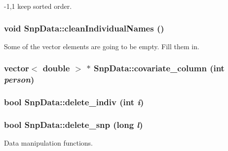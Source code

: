 -\/1,1 keep sorted order. \hypertarget{classSnpData_ae6d6c89606d8176f34b11b253b40f191}{
\subsubsection[{cleanIndividualNames}]{\setlength{\rightskip}{0pt plus 5cm}void SnpData::cleanIndividualNames ()}}
\label{classSnpData_ae6d6c89606d8176f34b11b253b40f191}
Some of the vector elements are going to be empty. Fill them in. \hypertarget{classSnpData_aadd312f6c8d9060a199728bf7e81a1fc}{
\subsubsection[{covariate\_\-column}]{\setlength{\rightskip}{0pt plus 5cm}vector$<$ double $>$ $\ast$ SnpData::covariate\_\-column (int {\em person})}}
\label{classSnpData_aadd312f6c8d9060a199728bf7e81a1fc}
\hypertarget{classSnpData_af7caa689a8257f534cd6a92dac45ee82}{
\subsubsection[{delete\_\-indiv}]{\setlength{\rightskip}{0pt plus 5cm}bool SnpData::delete\_\-indiv (int {\em i})}}
\label{classSnpData_af7caa689a8257f534cd6a92dac45ee82}
\hypertarget{classSnpData_a4aed56566f1194ab787b604563783280}{
\subsubsection[{delete\_\-snp}]{\setlength{\rightskip}{0pt plus 5cm}bool SnpData::delete\_\-snp (long {\em l})}}
\label{classSnpData_a4aed56566f1194ab787b604563783280}


Data manipulation functions. 

